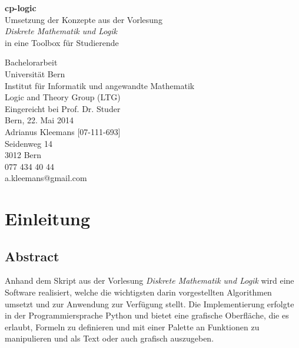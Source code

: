\documentclass[11pt,a4paper,ngerman]{scrreprt}
\begin{document}
\date{\today}
\begin{titlepage}
\begin{center}
\vspace*{1.5cm}
\Large \textbf{cp-logic} \\
\Large {Umsetzung der Konzepte aus der Vorlesung \\ \textit{Diskrete Mathematik und Logik} \\ in eine Toolbox für Studierende}
\vspace*{1.5cm}

\vspace*{0.5cm}
\large {Bachelorarbeit}\\
\vspace*{2cm}
\large {Universität Bern \\ Institut für Informatik und angewandte Mathematik \\ Logic and Theory Group (LTG) \\}
\vspace*{2cm}
\large {Eingereicht bei Prof. Dr. Studer}\\
\large {Bern, 22. Mai 2014}\\
\vspace*{1cm}
\large {Adrianus Kleemans [07-111-693]}\\
\large {Seidenweg 14}\\
\large {3012 Bern}\\
\large {077 434 40 44}\\
\large {a.kleemans@gmail.com}\\
\end{center}
\end{titlepage}

\normalsize

\tableofcontents
\clearpage
\renewcommand{\baselinestretch}{1.5}

\chapter{Einleitung}  %
\section{Abstract}
Anhand dem Skript aus der Vorlesung \textit{Diskrete Mathematik und Logik} wird eine Software realisiert, welche die wichtigsten darin vorgestellten Algorithmen umsetzt und zur Anwendung zur Verfügung stellt. Die Implementierung erfolgte in der Programmiersprache Python und bietet eine grafische Oberfläche, die es erlaubt, Formeln zu definieren und mit einer Palette an Funktionen zu manipulieren und als Text oder auch grafisch auszugeben.
\end{document}
